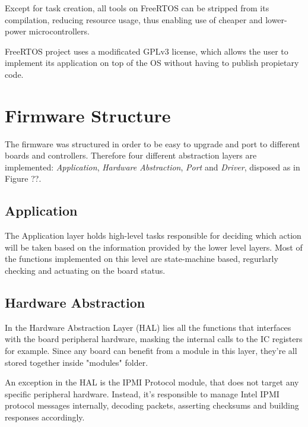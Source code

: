 \documentclass[a4paper,
              ]{jacow}
\begin{document}
Except for task creation, all tools on FreeRTOS can be stripped from its compilation, reducing resource usage, thus enabling use of cheaper and lower-power microcontrollers.

FreeRTOS project uses a modificated GPLv3 license, which allows the user to implement its application on top of the OS without having to publish propietary code.

\section{Firmware Structure}
The firmware was structured in order to be easy to upgrade and port to different boards and controllers.
Therefore four different abstraction layers are implemented: \emph{Application}, \emph{Hardware Abstraction}, \emph{Port} and \emph{Driver}, disposed as in Figure ??.


\subsection{Application}
The Application layer holds high-level tasks responsible for deciding which action will be taken based on the information provided by the lower level layers. Most of the functions implemented on this level are state-machine based, regurlarly checking and actuating on the board status.

\subsection{Hardware Abstraction}
In the Hardware Abstraction Layer (HAL) lies all the functions that interfaces with the board peripheral hardware, masking the internal calls to the IC registers for example. Since any board can benefit from a module in this layer, they're all stored together inside "modules" folder.

An exception in the HAL is the IPMI Protocol module, that does not target any specific peripheral hardware. Instead, it's responsible to manage Intel IPMI protocol messages internally, decoding packets, asserting checksums and building responses accordingly.
\end{document}

